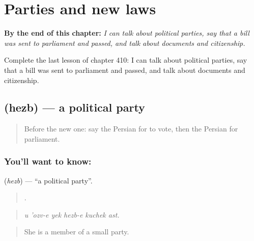 
\chapter{Parties and new laws}
\label{ch:fa-parties-and-new-laws}

\begin{chapteropening}
\textbf{By the end of this chapter:} \emph{I can talk about political parties, say that a bill was sent to parliament and passed, and talk about documents and citizenship.}

Complete the last lesson of chapter 410: I can talk about political parties, say that a bill was sent to parliament and passed, and talk about documents and citizenship.
\end{chapteropening}

\section[\texorpdfstring{\fa{حزب} (hezb)}{حزب (hezb)}]{ (hezb) — a political party}

\label{lesson:FA-C410-hezb}



\begin{quote}
Before the new one: say the Persian for to vote, then the Persian for parliament.
\end{quote}

\subsection*{You'll want to know: }
\textbf{} (\emph{hezb}) — \textquotedblleft{}a political party\textquotedblright{}.

\begin{quote}
     .
\end{quote}

\begin{quote}
\emph{u 'ozv-e yek hezb-e kuchek ast.}
\end{quote}

\begin{quote}
She is a member of a small party.
\end{quote}


